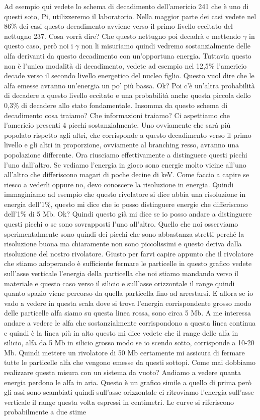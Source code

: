 {Ad esempio qui vedete lo schema di decadimento dell'americio 241 che è uno di questi soto, Pi, utilizzeremo il laboratorio. Nella maggior parte dei casi vedete nel 86\% dei casi questo decadimento avviene verso il primo livello eccitato del nettugno 237. Cosa vorrà dire? Che questo nettugno poi decadrà e mettendo $\gamma$ in questo caso, però noi i $\gamma$ non li misuriamo quindi vedremo sostanzialmente delle alfa derivanti da questo decadimento con un'opportuna energia. Tuttavia questo non è l'unica modalità di decadimento, vedete ad esempio nel 12,5\% l'americio decade verso il secondo livello energetico del nucleo figlio. Questo vuol dire che le alfa emesse avranno un'energia un po' più bassa. Ok? Poi c'è un'altra probabilità di decadere a questo livello eccitato e una probabilità anche questa piccola dello 0,3\% di decadere allo stato fondamentale. Insomma da questo schema di decadimento cosa traiamo? Che informazioni traiamo? Ci aspettiamo che l'americio presenti 4 picchi sostanzialmente. Uno ovviamente che sarà più popolato rispetto agli altri, che corrisponde a questo decadimento verso il primo livello e gli altri in proporzione, ovviamente al branching resso, avranno una popolazione differente. Ora riusciamo effettivamente a distinguere questi picchi l'uno dall'altro. Se vediamo l'energia in gioco sono energie molto vicine all'uno all'altro che differiscono magari di poche decine di keV. Come faccio a capire se riesco a vederli oppure no, devo conoscere la risoluzione in energia. Quindi immaginiamo ad esempio che questo rivolatore si dice abbia una risoluzione in energia dell'1\%, questo mi dice che io posso distinguere energie che differiscono dell'1\% di 5 Mb. Ok? Quindi questo già mi dice se io posso andare a distinguere questi picchi o se sono sovrapposti l'uno all'altro. Quello che noi osserviamo sperimentalmente sono quindi dei picchi che sono abbastanza stretti perché la risoluzione buona ma chiaramente non sono piccolissimi e questo deriva dalla risoluzione del nostro rivolatore. Giusto per farvi capire appunto che il rivolatore che stiamo adoperando è sufficiente fermare le particelle in questo grafico vedete sull'asse verticale l'energia della particella che noi stiamo mandando verso il materiale e questo caso verso il silicio e sull'asse orizzontale il range quindi quanto spazio viene percorso da quella particella fino ad arrestarsi. E allora se io vado a vedere in questa scala dove si trova l'energia corrispondente grosso modo delle particelle alfa siamo su questa linea rossa, sono circa 5 Mb. A me interessa andare a vedere le alfa che sostanzialmente corrispondono a questa linea continua e quindi è la linea più in alto questo mi dice vedete che il range delle alfa in silicio, alfa da 5 Mb in silicio grosso modo se io scendo sotto, corrisponde a 10-20 Mb. Quindi mettere un rivolatore di 50 Mb certamente mi assicura di fermare tutte le particelle alfa che vengono emesse da questi sottopi. Come mai dobbiamo realizzare questa misura con un sistema da vuoto? Andiamo a vedere quanta energia perdono le alfa in aria. Questo è un grafico simile a quello di prima però gli assi sono scambiati quindi sull'asse orizzontale ci ritroviamo l'energia sull'asse verticale il range questa volta espressi in centimetri. Le curve si riferiscono probabilmente a due stime }
